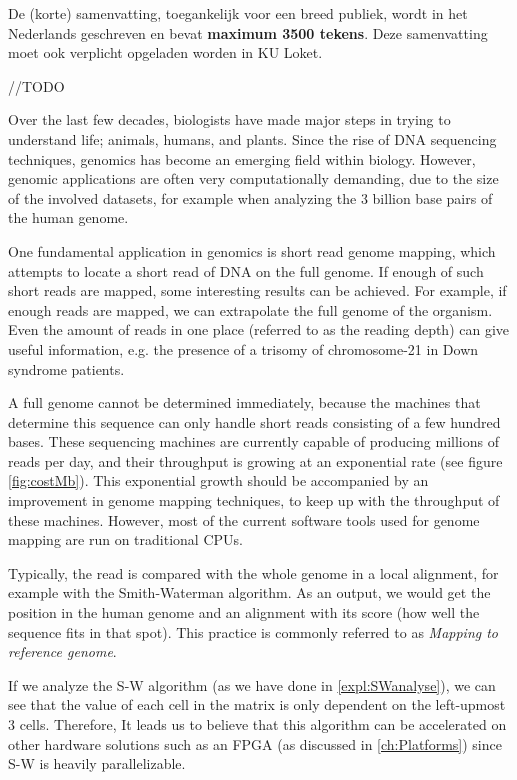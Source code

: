 De (korte) samenvatting, toegankelijk voor een breed publiek, wordt in het Nederlands geschreven en bevat {\bf maximum 3500 tekens}. Deze samenvatting moet ook verplicht opgeladen worden in KU Loket.

//TODO

Over the last few decades, biologists have made major steps in trying to understand life; animals, humans, and plants. Since the rise of DNA sequencing techniques, genomics has become an emerging field within biology. However, genomic applications are often very computationally demanding, due to the size of the involved datasets, for example when analyzing the 3 billion base pairs of the human genome.

One fundamental application in genomics is short read genome mapping, which attempts to locate a short read of DNA on the full genome. If enough of such short reads are mapped, some interesting results can be achieved. For example, if enough reads are mapped, we can extrapolate the full genome of the organism. Even the amount of reads in one place (referred to as the reading depth) can give useful information, e.g. the presence of a trisomy of chromosome-21 in Down syndrome patients.

A full genome cannot be determined immediately, because the machines that determine this sequence can only handle short reads consisting of a few hundred bases. These sequencing machines are currently capable of producing millions of reads per day, and their throughput is growing at an exponential rate (see figure \ref{fig:costMb}). This exponential growth should be accompanied by an improvement in genome mapping techniques, to keep up with the throughput of these machines. However, most of the current software tools used for genome mapping are run on traditional CPUs. 

Typically, the read is compared with the whole genome in a local alignment, for example with the Smith-Waterman algorithm. As an output, we would get the position in the human genome and an alignment with its score (how well the sequence fits in that spot). This practice is commonly referred to as \emph{Mapping to reference genome}.

If we analyze the S-W algorithm (as we have done in \ref{expl:SWanalyse}), we can see that the value of each cell in the matrix is only dependent on the left-upmost 3 cells. Therefore, It leads us to believe that this algorithm can be accelerated on other hardware solutions such as an FPGA (as discussed in \ref{ch:Platforms}) since S-W is heavily parallelizable.

